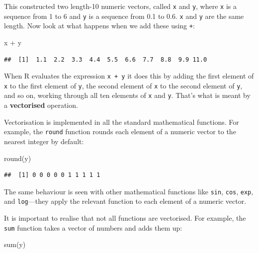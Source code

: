 \documentclass[
]{book}
\newenvironment{Shaded}{\begin{snugshade}}{\end{snugshade}}
\newcommand{\FunctionTok}[1]{\textcolor[rgb]{0.00,0.00,0.00}{#1}}
\newcommand{\NormalTok}[1]{#1}
\newcommand{\SpecialCharTok}[1]{\textcolor[rgb]{0.00,0.00,0.00}{#1}}
\begin{document}
This constructed two length-10 numeric vectors, called \texttt{x} and \texttt{y}, where \texttt{x} is a sequence from 1 to 6 and \texttt{y} is a sequence from 0.1 to 0.6. \texttt{x} and \texttt{y} are the same length. Now look at what happens when we add these using \texttt{+}:

\begin{Shaded}
\begin{Highlighting}[]
\NormalTok{x }\SpecialCharTok{+}\NormalTok{ y}
\end{Highlighting}
\end{Shaded}

\begin{verbatim}
##  [1]  1.1  2.2  3.3  4.4  5.5  6.6  7.7  8.8  9.9 11.0
\end{verbatim}

When R evaluates the expression \texttt{x\ +\ y} it does this by adding the first element of \texttt{x} to the first element of \texttt{y}, the second element of \texttt{x} to the second element of \texttt{y}, and so on, working through all ten elements of \texttt{x} and \texttt{y}. That's what is meant by a \textbf{vectorised} operation.

Vectorisation is implemented in all the standard mathematical functions. For example, the \texttt{round} function rounds each element of a numeric vector to the nearest integer by default:

\begin{Shaded}
\begin{Highlighting}[]
\FunctionTok{round}\NormalTok{(y)}
\end{Highlighting}
\end{Shaded}

\begin{verbatim}
##  [1] 0 0 0 0 0 1 1 1 1 1
\end{verbatim}

The same behaviour is seen with other mathematical functions like \texttt{sin}, \texttt{cos}, \texttt{exp}, and \texttt{log}---they apply the relevant function to each element of a numeric vector.

It is important to realise that not all functions are vectorised. For example, the \texttt{sum} function takes a vector of numbers and adds them up:

\begin{Shaded}
\begin{Highlighting}[]
\FunctionTok{sum}\NormalTok{(y)}
\end{Highlighting}
\end{Shaded}
\end{document}
